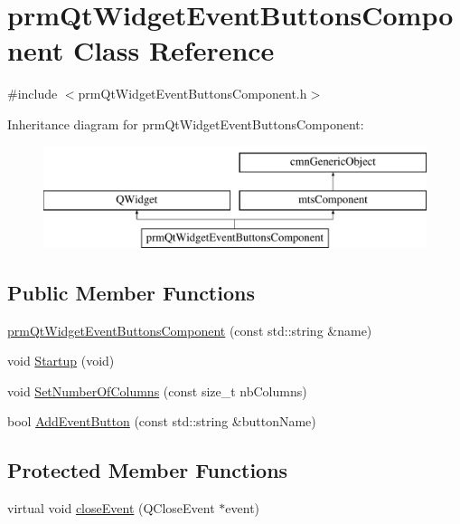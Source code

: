 \hypertarget{classprm_qt_widget_event_buttons_component}{\section{prm\-Qt\-Widget\-Event\-Buttons\-Component Class Reference}
\label{classprm_qt_widget_event_buttons_component}
}


{\ttfamily \#include $<$prm\-Qt\-Widget\-Event\-Buttons\-Component.\-h$>$}

Inheritance diagram for prm\-Qt\-Widget\-Event\-Buttons\-Component\-:\begin{figure}[H]
\begin{center}
\leavevmode
\includegraphics[height=3.000000cm]{d9/dd0/classprm_qt_widget_event_buttons_component}
\end{center}
\end{figure}
\subsection*{Public Member Functions}
\begin{DoxyCompactItemize}
\item 
\hyperlink{classprm_qt_widget_event_buttons_component_a364df2f185553abac1b0aafb0c118122}{prm\-Qt\-Widget\-Event\-Buttons\-Component} (const std\-::string \&name)
\item 
void \hyperlink{classprm_qt_widget_event_buttons_component_aebcb8482c578eb77f45ae6aafa6b7d3b}{Startup} (void)
\item 
void \hyperlink{classprm_qt_widget_event_buttons_component_a166d03defc93acb2beccc7f083818837}{Set\-Number\-Of\-Columns} (const size\-\_\-t nb\-Columns)
\item 
bool \hyperlink{classprm_qt_widget_event_buttons_component_a3f2fcdda3a6fb7430d31affddd917e43}{Add\-Event\-Button} (const std\-::string \&button\-Name)
\end{DoxyCompactItemize}
\subsection*{Protected Member Functions}
\begin{DoxyCompactItemize}
\item 
virtual void \hyperlink{classprm_qt_widget_event_buttons_component_a80ea695016d5c35d628cd91785d23b38}{close\-Event} (Q\-Close\-Event $\ast$event)
\end{DoxyCompactItemize}
